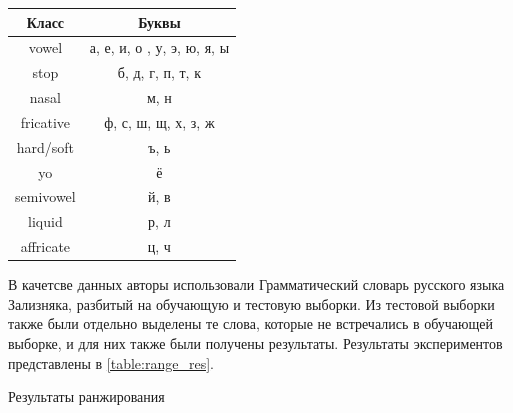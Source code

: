 \documentclass[14pt, a4paper, russian]{report}
\begin{document}
\begin{normalsize}
\begin{table}[H]
	\begin{small}
		\begin{center}
			\begin{tabular}{|c|c|}
				\hline
				  Класс   &           Буквы            \\ \hline
				  vowel   & а, е, и, о , у, э, ю, я, ы \\ \hline
				  stop    &      б, д, г, п, т, к      \\ \hline
				  nasal   &            м, н            \\ \hline
				fricative &    ф, с, ш, щ, х, з, ж     \\ \hline
				hard/soft &            ъ, ь            \\ \hline
				   yo     &             ё              \\ \hline
				semivowel &            й, в            \\ \hline
				 liquid   &            р, л            \\ \hline
				affricate &            ц, ч            \\ \hline
			\end{tabular}
		\end{center}
	\end{small}
	\label{table:phon_class}
\end{table}

В качетсве данных авторы использовали Грамматический словарь русского языка Зализняка\cite{zaliz}, разбитый на обучающую и тестовую выборки. Из тестовой выборки также были отдельно выделены те слова, которые не встречались в обучающей выборке,  и для них также были получены  результаты. Результаты экспериментов представлены в \cref{table:range_res}.
\begin{table}[H]
		\caption{Результаты ранжирования}


\end{table}
\end{normalsize}
\end{document}

